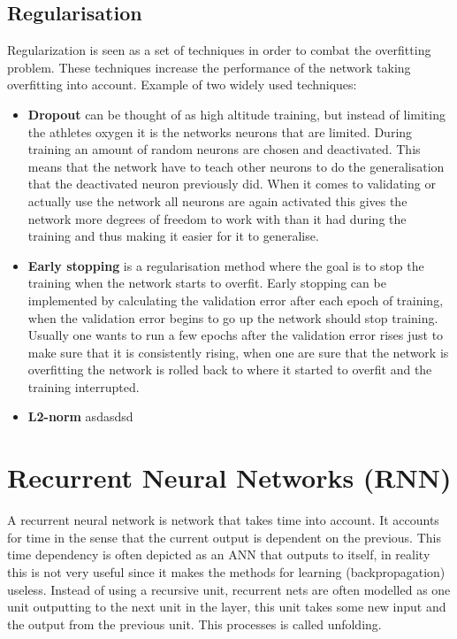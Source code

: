 \subsection{Regularisation}
Regularization is seen as a set of techniques in order to combat the overfitting problem. These techniques increase the performance of the network taking overfitting into account. Example of two widely used techniques:
\begin{itemize}%
\item \textbf{Dropout} can be thought of as high altitude training, but instead of limiting the athletes oxygen it is the networks neurons that are limited. During training an amount of random neurons are chosen and deactivated. This means that the network have to teach other neurons to do the generalisation that the deactivated neuron previously did. When it comes to validating or actually use the network all neurons are again activated this gives the network more degrees of freedom to work with than it had during the training and thus making it easier for it to generalise.  %
\item \textbf{Early stopping} is a regularisation method where the goal is to stop the training when the network starts to overfit. Early stopping can be implemented by calculating the validation error after each epoch of training, when the validation error begins to go up the network should stop training. Usually one wants to run a few epochs after the validation error rises just to make sure that it is consistently rising, when one are sure that the network is overfitting the network is rolled back to where it started to overfit and the training interrupted.
\item \textbf{L2-norm} asdasdsd
\end{itemize}


\section{Recurrent Neural Networks (RNN)}
A recurrent neural network is network that takes time into account. It accounts for time in the sense that the current output is dependent on the previous. This time dependency is often depicted as an ANN that outputs to itself, in reality this is not very useful since it makes the methods for learning (backpropagation) useless. Instead of using a recursive unit, recurrent nets are often modelled as one unit outputting to the next unit in the layer, this unit takes some new input and the output from the previous unit. This processes is called unfolding.%


